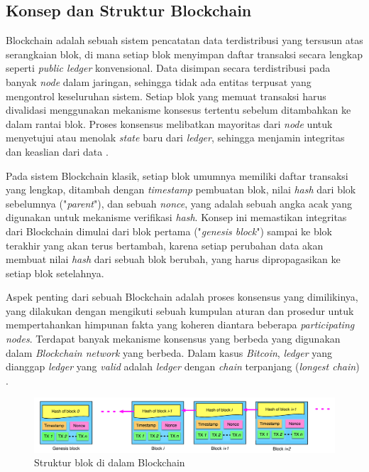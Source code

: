 \subsection{Konsep dan Struktur Blockchain}
\label{subsec:konsep-struktur-blockchain}

Blockchain adalah sebuah sistem pencatatan data terdistribusi yang tersusun atas serangkaian blok, di mana setiap blok menyimpan daftar transaksi secara lengkap seperti \textit{public ledger} konvensional. Data disimpan secara terdistribusi pada banyak \textit{node} dalam jaringan, sehingga tidak ada entitas terpusat yang mengontrol keseluruhan sistem. Setiap blok yang memuat transaksi harus divalidasi menggunakan mekanisme konsesus tertentu sebelum ditambahkan ke dalam rantai blok. Proses konsensus melibatkan mayoritas dari \textit{node} untuk menyetujui atau menolak \textit{state} baru dari \textit{ledger}, sehingga menjamin integritas dan keaslian dari data \parencite{zheng2018blockchain,nofer2017blockchain}.

Pada sistem Blockchain klasik, setiap blok umumnya memiliki daftar transaksi yang lengkap, ditambah dengan \textit{timestamp} pembuatan blok, nilai \textit{hash} dari blok sebelumnya ("\textit{parent}"), dan sebuah \textit{nonce}, yang adalah sebuah angka acak yang digunakan untuk mekanisme verifikasi \textit{hash}. 
Konsep ini memastikan integritas dari Blockchain dimulai dari blok pertama ("\textit{genesis block}") sampai ke blok terakhir yang akan terus bertambah, karena setiap perubahan data akan membuat nilai \textit{hash} dari sebuah blok berubah, yang harus dipropagasikan ke setiap blok setelahnya.

Aspek penting dari sebuah Blockchain adalah proses konsensus yang dimilikinya, yang dilakukan dengan mengikuti sebuah kumpulan aturan dan prosedur untuk mempertahankan himpunan fakta yang koheren diantara beberapa \textit{participating nodes}. Terdapat banyak mekanisme konsensus yang berbeda yang digunakan dalam \textit{Blockchain network} yang berbeda. Dalam kasus \textit{Bitcoin}, \textit{ledger} yang dianggap \textit{ledger} yang \textit{valid} adalah \textit{ledger} dengan \textit{chain} terpanjang (\textit{longest chain}) \parencite{swanson2015consensus}.

\begin{figure}[ht]
	\centering
	\includegraphics[width=1\textwidth]{resources/chapter-2/struktur-blockchain.png}
	\caption{Struktur blok di dalam Blockchain \parencite{zheng2018blockchain}}
	\label{image:struktur-blockchain}
\end{figure}

